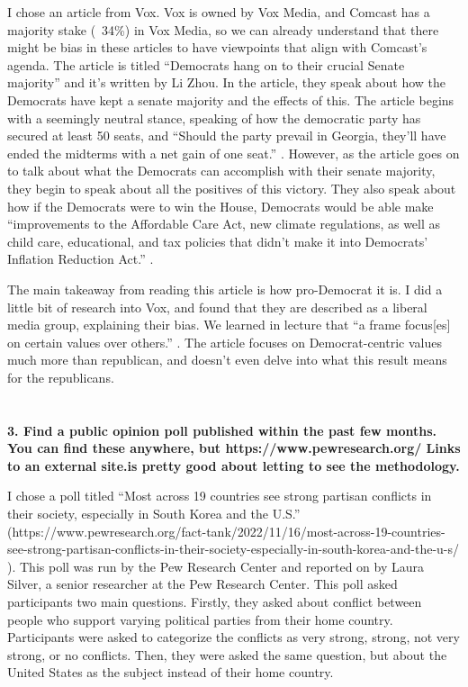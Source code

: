 \documentclass[a4paper]{article}
\begin{document}
        I chose an article from Vox. Vox is owned by Vox Media, and Comcast has a majority stake (~34\%) in Vox Media, so we can already understand that there might be bias in these articles to have viewpoints that align with Comcast’s agenda. 
        The article is titled “Democrats hang on to their crucial Senate majority” and it's written by Li Zhou. In the article, they speak about how the Democrats have kept a senate majority and the effects of this. The article begins with a seemingly neutral stance, 
        speaking of how the democratic party has secured at least 50 seats, and “Should the party prevail in Georgia, they’ll have ended the midterms with a net gain of one seat.” \citep{vox}. However, as the article goes on to talk about what the Democrats 
        can accomplish with their senate majority, they begin to speak about all the positives of this victory. They also speak about how if the Democrats were to win the House, Democrats would be able make “improvements to the Affordable Care Act, new climate regulations, 
        as well as child care, educational, and tax policies that didn’t make it into Democrats’ Inflation Reduction Act.” \citep{vox}. 

        The main takeaway from reading this article is how pro-Democrat it is. I did a little bit of research into Vox, and found that they are described as a liberal media group, explaining their bias. We learned in lecture that “a frame focus[es] on certain values over 
        others.” \citep{lesson7}. The article focuses on Democrat-centric values much more than republican, and doesn’t even delve into what this result means for the republicans. 


    \section{}
        \textbf{3. Find a public opinion poll published within the past few months. You can find these anywhere, but https://www.pewresearch.org/ Links to an external site.is pretty good about letting to see the methodology.}
        
        I chose a poll titled “Most across 19 countries see strong partisan conflicts in their society, especially in South Korea and the U.S.” (https://www.pewresearch.org/fact-tank/2022/11/16/most-across-19-countries-see-strong-partisan-conflicts-in-their-society-especially-in-south-korea-and-the-u-s/ ). 
        This poll was run by the Pew Research Center and reported on by Laura Silver, a senior researcher at the Pew Research Center. This poll asked participants two main questions. Firstly, they asked about conflict between people who support varying political parties from their home country. 
        Participants were asked to categorize the conflicts as very strong, strong, not very strong, or no conflicts. Then, they were asked the same question, but about the United States as the subject instead of their home country. 
\end{document}
